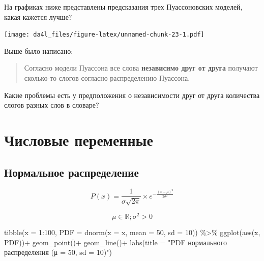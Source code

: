 \documentclass[
]{book}
\makeatletter
\newenvironment{Shaded}{\begin{snugshade}}{\end{snugshade}}
\newcommand{\AttributeTok}[1]{\textcolor[rgb]{0.77,0.63,0.00}{#1}}
\newcommand{\DecValTok}[1]{\textcolor[rgb]{0.00,0.00,0.81}{#1}}
\newcommand{\FunctionTok}[1]{\textcolor[rgb]{0.00,0.00,0.00}{#1}}
\newcommand{\NormalTok}[1]{#1}
\newcommand{\SpecialCharTok}[1]{\textcolor[rgb]{0.00,0.00,0.00}{#1}}
\newcommand{\StringTok}[1]{\textcolor[rgb]{0.31,0.60,0.02}{#1}}
\newenvironment{kframe}{%
    \medskip{}
    \setlength{\fboxsep}{.8em}
    \def\at@end@of@kframe{}%
    \ifinner\ifhmode%
    \def\at@end@of@kframe{\end{minipage}}%
    \begin{minipage}{\columnwidth}%
    \fi\fi%
    \def\FrameCommand##1{\hskip\@totalleftmargin \hskip-\fboxsep
    \colorbox{shadecolor}{##1}\hskip-\fboxsep
        \hskip-\linewidth \hskip-\@totalleftmargin \hskip\columnwidth}%
    \MakeFramed {\advance\hsize-\width
      \@totalleftmargin\z@ \linewidth\hsize
      \@setminipage}}%
  {\par\unskip\endMakeFramed%
    \at@end@of@kframe}
\newenvironment{rmdblock}[1]
  {
    \begin{itemize}
    \renewcommand{\labelitemi}{
      \raisebox{-.7\height}[0pt][0pt]{
        {\setkeys{Gin}{width=3em,keepaspectratio}\texttt{[image: images/\#1]}}
        }
        }
        \setlength{\fboxsep}{1em}
        \begin{kframe}
        \item
      }
      {
        \end{kframe}
        \end{itemize}
      }
\newenvironment{rmdtask}
      {\begin{rmdblock}{task}}
      {\end{rmdblock}}
\makeatother
\begin{document}
\begin{rmdtask}
На графиках ниже представлены предсказания трех Пуассоновских моделей,
какая кажется лучше?
\end{rmdtask}

\texttt{[image: da4l\_files/figure-latex/unnamed-chunk-23-1.pdf]}

\begin{rmdtask}
Выше было написано:

\begin{quote}
Согласно модели Пуассона все слова \textbf{независимо друг от друга}
получают сколько-то слогов согласно распределению Пуассона.
\end{quote}

Какие проблемы есть у предположения о независимости друг от друга
количества слогов разных слов в словаре?
\end{rmdtask}

\hypertarget{ux447ux438ux441ux43bux43eux432ux44bux435-ux43fux435ux440ux435ux43cux435ux43dux43dux44bux435}{%
\section{Числовые переменные}\label{ux447ux438ux441ux43bux43eux432ux44bux435-ux43fux435ux440ux435ux43cux435ux43dux43dux44bux435}}

\hypertarget{ux43dux43eux440ux43cux430ux43bux44cux43dux43eux435-ux440ux430ux441ux43fux440ux435ux434ux435ux43bux435ux43dux438ux435}{%
\subsection{Нормальное распределение}\label{ux43dux43eux440ux43cux430ux43bux44cux43dux43eux435-ux440ux430ux441ux43fux440ux435ux434ux435ux43bux435ux43dux438ux435}}

\[P(x) = \frac{1}{\sigma\sqrt{2\pi}}\times e^{-\frac{\left(x-\mu\right)^2}{2\sigma^2}}\]

\[\mu \in \mathbb{R}; \sigma^2 > 0\]

\begin{Shaded}
\begin{Highlighting}[]
\FunctionTok{tibble}\NormalTok{(}\AttributeTok{x =} \DecValTok{1}\SpecialCharTok{:}\DecValTok{100}\NormalTok{,}
       \AttributeTok{PDF =} \FunctionTok{dnorm}\NormalTok{(}\AttributeTok{x =}\NormalTok{ x, }\AttributeTok{mean =} \DecValTok{50}\NormalTok{, }\AttributeTok{sd =} \DecValTok{10}\NormalTok{)) }\SpecialCharTok{\%\textgreater{}\%} 
  \FunctionTok{ggplot}\NormalTok{(}\FunctionTok{aes}\NormalTok{(x, PDF))}\SpecialCharTok{+}
  \FunctionTok{geom\_point}\NormalTok{()}\SpecialCharTok{+}
  \FunctionTok{geom\_line}\NormalTok{()}\SpecialCharTok{+}
  \FunctionTok{labs}\NormalTok{(}\AttributeTok{title =} \StringTok{"PDF нормального распределения (μ = 50, sd = 10)"}\NormalTok{)}
\end{Highlighting}
\end{Shaded}
\end{document}
